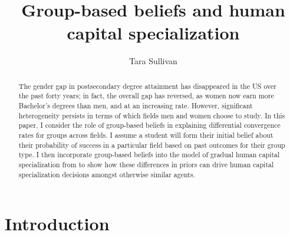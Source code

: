 \documentclass[10 pt]{article}
\begin{document}

\title{Group-based beliefs and human capital specialization}
\author{Tara Sullivan%
}

\maketitle
\onehalfspacing

\noindent{}

\begin{abstract}
The gender gap in postsecondary degree attainment has disappeared in the US over the past forty years; in fact, the overall gap has reversed, as women now earn more Bachelor's degrees than men, and at an increasing rate. 
However, significant heterogeneity persists in terms of which fields men and women choose to study. 
In this paper, I consider the role of group-based beliefs in explaining differential convergence rates for groups across fields. 
I assume a student will form their initial belief about their probability of success in a particular field based on past outcomes for their group type. 
I then incorporate group-based beliefs into the model of gradual human capital specialization from \textcite{AF20} to show how these differences in priors can drive human capital specialization decisions amongst otherwise similar agents. 
\end{abstract}

\section{Introduction}

\end{document}
